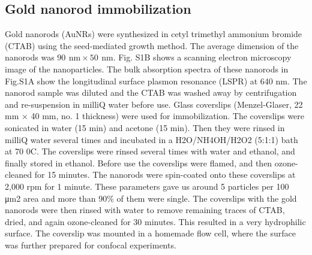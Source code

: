 \documentclass[journal=jacsat,manuscript=article]{achemso}
\newcommand{\nm}{\ensuremath{\,\textrm{nm}}}
\begin{document}
\subsection{Gold nanorod immobilization}
Gold nanorods (AuNRs) were synthesized in cetyl trimethyl ammonium bromide (CTAB) using the seed-mediated growth method.\cite{nikoobakht2003preparation} The average dimension of the nanorods was $90~\nm\times50~\nm$. Fig. S1B shows a scanning electron microscopy image of the nanoparticles. The bulk absorption spectra of these nanorods in Fig.S1A show the longitudinal surface plasmon resonance (LSPR) at 640 nm. The nanorod sample was diluted and the CTAB was washed away by centrifugation and re-suspension in milliQ water before use. Glass coverslips (Menzel-Glaser, 22 mm × 40 mm, no. 1 thickness) were used for immobilization. The coverslips were sonicated in water (15 min) and acetone (15 min). Then they were rinsed in milliQ water several times and incubated in a H2O/NH4OH/H2O2 (5:1:1) bath at 70 0C. The coverslips were rinsed several times with water and ethanol, and finally stored in ethanol. Before use the coverslips were flamed, and then ozone-cleaned for 15 minutes. The nanorods were spin-coated onto these coverslips at 2,000 rpm for 1 minute. These parameters gave us around 5 particles per 100 μm2 area and more than 90\% of them were single. The coverslips with the gold nanorods were then rinsed with water to remove remaining traces of CTAB, dried, and again ozone-cleaned for 30 minutes. This resulted in a very  hydrophilic surface. The coverslip was mounted in a homemade flow cell, where the surface was further prepared for confocal experiments.
% 

\end{document}
